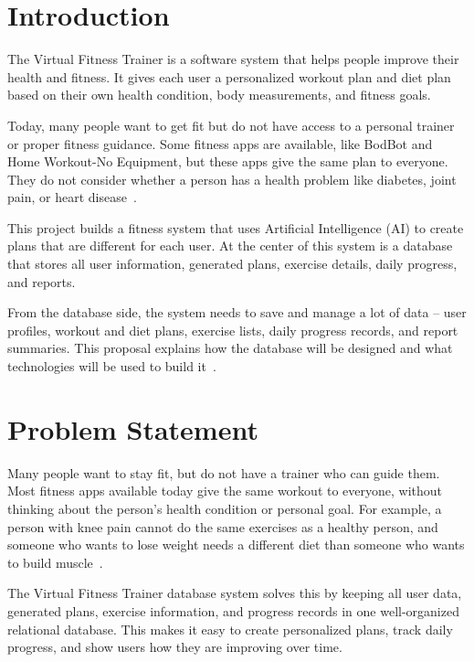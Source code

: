 \documentclass[12pt,a4paper]{article}
\begin{document}
\section{Introduction}

The Virtual Fitness Trainer is a software system that helps people improve their health and
fitness. It gives each user a personalized workout plan and diet plan based on their own
health condition, body measurements, and fitness goals.

Today, many people want to get fit but do not have access to a personal trainer or proper
fitness guidance. Some fitness apps are available, like BodBot and Home Workout-No
Equipment, but these apps give the same plan to everyone. They do not consider whether a
person has a health problem like diabetes, joint pain, or heart disease~\cite{bodbot,homeworkout}.

This project builds a fitness system that uses Artificial Intelligence (AI) to create plans
that are different for each user. At the center of this system is a database that stores all
user information, generated plans, exercise details, daily progress, and reports.

From the database side, the system needs to save and manage a lot of data -- user profiles,
workout and diet plans, exercise lists, daily progress records, and report summaries. This
proposal explains how the database will be designed and what technologies will be used to
build it~\cite{srs}.

\section{Problem Statement}

Many people want to stay fit, but do not have a trainer who can guide them. Most fitness
apps available today give the same workout to everyone, without thinking about the person's
health condition or personal goal. For example, a person with knee pain cannot do the same
exercises as a healthy person, and someone who wants to lose weight needs a different diet
than someone who wants to build muscle~\cite{srs}.

The Virtual Fitness Trainer database system solves this by keeping all user data, generated
plans, exercise information, and progress records in one well-organized relational database.
This makes it easy to create personalized plans, track daily progress, and show users how
they are improving over time.
\end{document}
